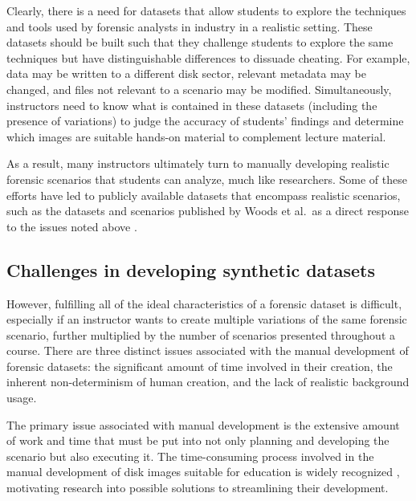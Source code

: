 \documentclass[letterpaper,12pt]{report}
\begin{document}
Clearly, there is a need for datasets that allow students to explore the
techniques and tools used by forensic analysts in industry in a
realistic setting. These datasets should be built such that they
challenge students to explore the same techniques but have
distinguishable differences to dissuade cheating. For example, data may
be written to a different disk sector, relevant metadata may be changed,
and files not relevant to a scenario may be modified. Simultaneously,
instructors need to know what is contained in these datasets (including
the presence of variations) to judge the accuracy of students' findings
and determine which images are suitable hands-on material to complement
lecture material.

As a result, many instructors ultimately turn to manually developing
realistic forensic scenarios that students can analyze, much like
researchers. Some of these efforts have led to publicly available
datasets that encompass realistic scenarios, such as the datasets and
scenarios published by Woods et al.~as a direct response to the issues
noted above \cite{woodsCreatingRealisticCorpora2011}.

\subsection{Challenges in developing synthetic
datasets}\label{challenges-in-developing-synthetic-datasets}

However, fulfilling all of the ideal characteristics of a forensic
dataset is difficult, especially if an instructor wants to create
multiple variations of the same forensic scenario, further multiplied by
the number of scenarios presented throughout a course. There are three
distinct issues associated with the manual development of forensic
datasets: the significant amount of time involved in their creation, the
inherent non-determinism of human creation, and the lack of realistic
background usage.

The primary issue associated with manual development is the extensive
amount of work and time that must be put into not only planning and
developing the scenario but also executing it. The time-consuming
process involved in the manual development of disk images suitable for
education is widely recognized
\cite{adelsteinAutomaticallyCreatingRealistic2005,gobelForTraceHolisticForensic2022,guptaDigitalForensicsLab2022,mochForensicImageGenerator2009,russellForensicImageDescription2012,scanlonEviPlantEfficientDigital2017,woodsCreatingRealisticCorpora2011},
motivating research into possible solutions to streamlining their
development.
\end{document}
